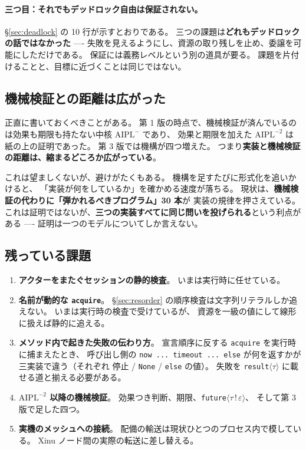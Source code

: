\documentclass[11pt,a4paper]{ltjsarticle}
\theoremstyle{definition}
\theoremstyle{remark}
\begin{document}
\paragraph{三つ目：それでもデッドロック自由は保証されない。}
\S\ref{sec:deadlock} の 10 行が示すとおりである。
三つの課題は\textbf{どれもデッドロックの話ではなかった} ----
失敗を見えるようにし、資源の取り残しを止め、委譲を可能にしただけである。
保証には義務レベルという別の道具が要る。
課題を片付けることと、目標に近づくことは同じではない。

\subsection{機械検証との距離は広がった}

正直に書いておくべきことがある。
第 1 版の時点で、機械検証が済んでいるのは効果も期限も持たない中核 $\mathrm{AIPL}^{-}$ であり、
効果と期限を加えた $\mathrm{AIPL}^{-2}$ は紙の上の証明であった。
第 3 版では機構が四つ増えた。
つまり\textbf{実装と機械検証の距離は、縮まるどころか広がっている}。

これは望ましくないが、避けがたくもある。
機構を足すたびに形式化を追いかけると、
「実装が何をしているか」を確かめる速度が落ちる。
現状は、\textbf{機械検証の代わりに「弾かれるべきプログラム」30 本}が
実装の規律を押さえている。
これは証明ではないが、\textbf{三つの実装すべてに同じ問いを投げられる}という利点がある ----
証明は一つのモデルについてしか言えない。

\subsection{残っている課題}

\begin{enumerate}
\item \textbf{アクターをまたぐセッションの静的検査}。
      いまは実行時に任せている。
\item \textbf{名前が動的な \texttt{acquire}}。
      \S\ref{sec:resorder} の順序検査は文字列リテラルしか追えない。
      いまは実行時の検査で受けているが、
      資源を一級の値にして線形に扱えば静的に追える。
\item \textbf{メソッド内で起きた失敗の伝わり方}。
      宣言順序に反する \texttt{acquire} を実行時に捕まえたとき、
      呼び出し側の \texttt{now ... timeout ... else} が何を返すかが
      三実装で違う（それぞれ 停止 / \texttt{None} / \texttt{else} の値）。
      失敗を \texttt{result}$\langle\tau\rangle$ に載せる道と揃える必要がある。
\item \textbf{$\mathrm{AIPL}^{-2}$ 以降の機械検証}。
      効果つき判断、期限、\texttt{future}$\langle\tau\,!\,\varepsilon\rangle$、
      そして第 3 版で足した四つ。
\item \textbf{実機のメッシュへの接続}。
      配備の輸送は現状ひとつのプロセス内で模している。
      Xinu ノード間の実際の転送に差し替える。
\end{enumerate}
\end{document}

